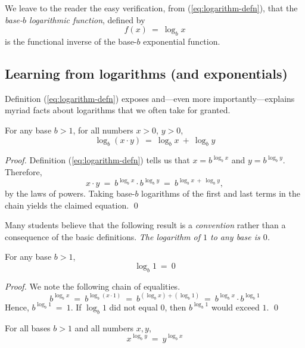 We leave to the reader the easy verification, from
(\ref{eq:logarithm-defn}), that the {\it base-$b$ logarithmic
  function}, defined by
\begin{equation}
\label{eq:log-function-defn}
f(x) \ = \ \log_b x
\end{equation}
is the functional inverse of the base-$b$ exponential function.

\subsection{Learning from logarithms (and exponentials)}

Definition (\ref{eq:logarithm-defn}) exposes and---even more
importantly---explains myriad facts about logarithms that we often
take for granted.

\begin{prop}
For any base $b >1$, for all numbers $x >0$, $y>0$,
\[ \log_b (x \cdot y) \ = \ \log_b x \ + \ \log_b y \]
\end{prop}

\begin{proof}
Definition (\ref{eq:logarithm-defn}) tells us that $x = b^{\log_b x}$
and $y = b^{\log_b y}$.  Therefore,
\[ x \cdot y \ = \ b^{\log_b x} \cdot b^{\log_b y} \ = \
b^{\log_b x \ + \ \log_b y}, \]
by the laws of powers.  Taking base-$b$ logarithms of the first and
last terms in the chain yields the claimed equation.
\qed
\end{proof}



Many students believe that the following result is a {\em convention}
rather than a consequence of the basic definitions.  {\em The logarithm
  of $1$ to any base is $0$.}

\begin{prop}
For any base $b >1$,
\[ \log_b 1 \ = \ 0 \]
\end{prop}

\begin{proof}
We note the following chain of equalities.
\[  b^{\log_b x} \ = \ b^{\log_b (x \cdot 1)} 
\ = \ b^{(\log_b x) + (\log_b 1)} 
\ = \ b^{\log_b x} \cdot b^{\log_b 1}
\]
Hence, $b^{\log_b 1} \ = \ 1$.  If $\log_b 1$ did not equal $0$, then
$b^{\log_b 1}$ would exceed $1$.  \qed
\end{proof}

\begin{prop}
For all bases $b > 1$ and all numbers $x, y$,
\[ x^{\log_b y} \ = \ y^{\log_b x} \]
\end{prop}

